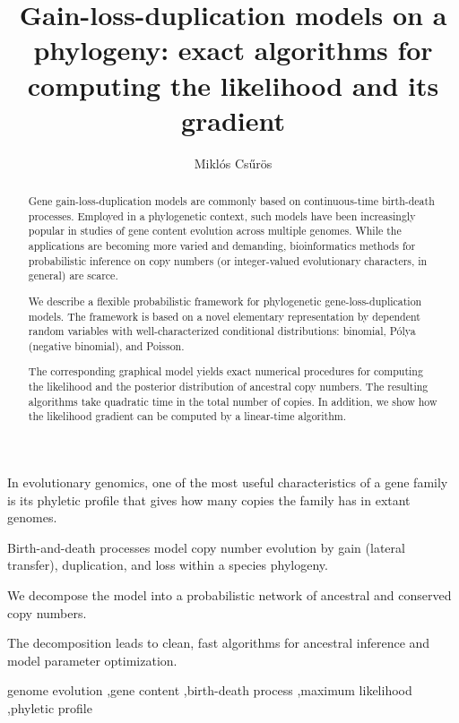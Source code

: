 \documentclass{elsarticle}
\begin{document}
\begin{frontmatter}


\title{Gain-loss-duplication models on a phylogeny: exact algorithms for computing the likelihood and its gradient}
\author{Mikl\'os Cs\H{u}r\"os}

\address{Department of Computer Science and Operations Research, Universit\'e de Montr\'eal; 
	C.P.~6128 succursale Centre-Ville, Montr\'eal, Qu\'ebec H3C~3J7, Canada}



\begin{highlights}
\item In evolutionary genomics, one of the most useful characteristics 
	of a gene family is its phyletic profile that gives how many copies the family has in extant genomes.
\item  Birth-and-death processes model copy number evolution by gain (lateral transfer), duplication, and loss 
within a species phylogeny.
\item We decompose the model into a probabilistic network of ancestral and conserved  
copy numbers.
\item The decomposition leads to clean, fast algorithms for ancestral
inference and model parameter optimization.
\end{highlights}


\begin{abstract}
Gene gain-loss-duplication models are commonly based on 
continuous-time birth-death processes. 
Employed in a phylogenetic context, such models have been 
increasingly popular in 
studies of gene content evolution across multiple genomes.  
While the applications are becoming more varied and demanding, 
bioinformatics methods for probabilistic inference on copy numbers 
(or integer-valued evolutionary characters, in general)
are scarce. 

We describe a flexible 
probabilistic framework for 
phylogenetic gene-loss-duplication models.
The framework is based on a novel elementary representation by 
dependent random variables 
with well-characterized 
conditional distributions: binomial, P\'olya (negative binomial), 
and Poisson.

The corresponding graphical model yields 
exact numerical procedures for  
computing the likelihood  
and the posterior distribution of ancestral copy numbers.
The resulting algorithms take quadratic time in the 
total number of 
copies. 
In addition, we show how the likelihood gradient can be computed 
by a linear-time algorithm. 
\end{abstract}


\begin{keyword}
genome evolution \sep gene content \sep birth-death process \sep maximum likelihood \sep phyletic profile
\end{keyword}

%

\end{frontmatter}
\end{document}
